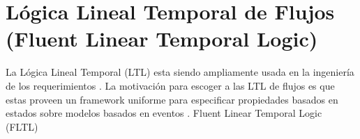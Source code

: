 \section{Lógica Lineal Temporal de Flujos (Fluent Linear Temporal Logic)}

La Lógica Lineal Temporal (LTL) esta siendo ampliamente usada en la ingeniería de los requerimientos
\cite{1347546,Giannakopoulou:2003:FMC:940071.940106,879820,Letier:2002:ATG:581339.581353}. La motivación para escoger a
las LTL de flujos es que estas proveen un framework uniforme para especificar propiedades basados en estados sobre
modelos basados en eventos \cite{Giannakopoulou:2003:FMC:940071.940106}. Fluent Linear Temporal Logic (FLTL) \cite{}
